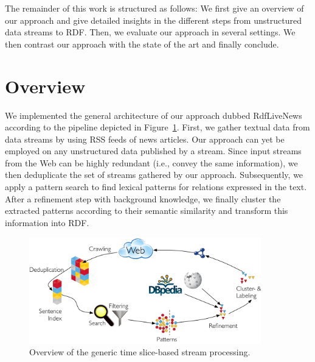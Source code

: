\documentclass[a4paper]{llncs}
\newcommand{\NAME}{RdfLiveNews}
\begin{document}
The remainder of this work is structured as follows: 
We first give an overview of our approach and give detailed insights in the different steps from unstructured data streams to RDF.
Then, we evaluate our approach in several settings.
We then contrast our approach with the state of the art and finally conclude.

\section{Overview}
We implemented the general architecture of our approach dubbed \NAME{} according to the pipeline depicted in Figure~\ref{fig:workflow}.
First, we gather textual data from data streams by using RSS feeds of news articles.
Our approach can yet be employed on any unstructured data published by a stream.
Since input streams from the Web can be highly redundant (i.e., convey the same information), we then deduplicate the set of streams gathered by our approach.
Subsequently, we apply a pattern search to find lexical patterns for relations expressed in the text.
After a refinement step with background knowledge, we finally cluster the extracted patterns according to their semantic similarity and transform this information into RDF.
\begin{figure}[htb]
	\begin{center}
		\includegraphics[width=0.9\textwidth]{images/rdflivenews_architecture.png}
	\end{center}
	\caption{Overview of the generic time slice-based stream processing.}
	\label{fig:workflow}
\end{figure}
\end{document}
